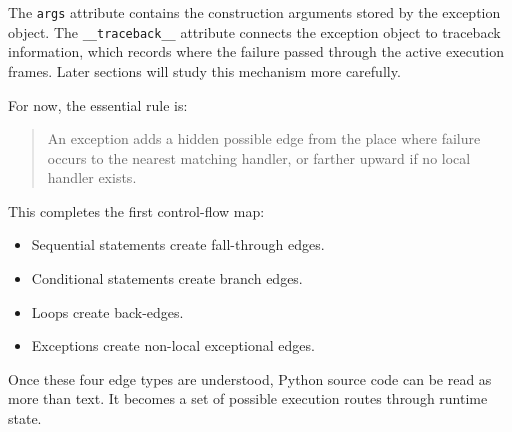 The \texttt{args} attribute contains the construction arguments stored by the exception object. The \texttt{\_\_traceback\_\_} attribute connects the exception object to traceback information, which records where the failure passed through the active execution frames. Later sections will study this mechanism more carefully.

For now, the essential rule is:

\begin{quote}
An exception adds a hidden possible edge from the place where failure occurs to the nearest matching handler, or farther upward if no local handler exists.
\end{quote}

This completes the first control-flow map:

\begin{itemize}
    \item Sequential statements create fall-through edges.
    \item Conditional statements create branch edges.
    \item Loops create back-edges.
    \item Exceptions create non-local exceptional edges.
\end{itemize}

Once these four edge types are understood, Python source code can be read as more than text. It becomes a set of possible execution routes through runtime state.